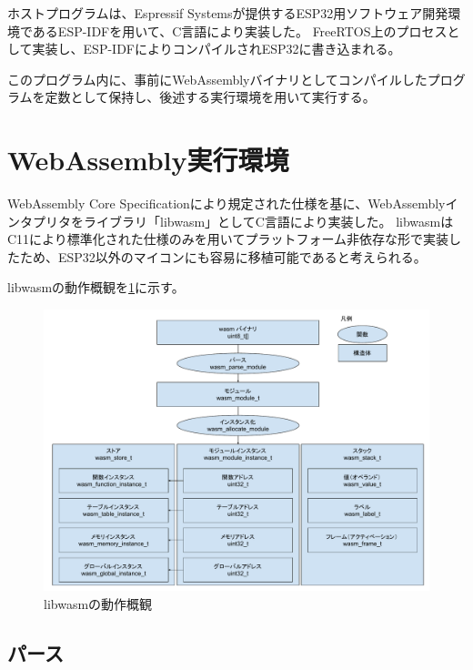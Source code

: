 ホストプログラムは、Espressif Systemsが提供するESP32用ソフトウェア開発環境であるESP-IDF\cite{esp_idf}を用いて、C言語により実装した。
FreeRTOS上のプロセスとして実装し、ESP-IDFによりコンパイルされESP32に書き込まれる。

このプログラム内に、事前にWebAssemblyバイナリとしてコンパイルしたプログラムを定数として保持し、後述する実行環境を用いて実行する。

\section{WebAssembly実行環境}

WebAssembly Core Specification\cite{wasm_spec}により規定された仕様を基に、WebAssemblyインタプリタをライブラリ「libwasm」としてC言語により実装した。
libwasmはC11により標準化された仕様のみを用いてプラットフォーム非依存な形で実装したため、ESP32以外のマイコンにも容易に移植可能であると考えられる。

libwasmの動作概観を\ref{fig:libwasm_arch}に示す。

\begin{figure}[htbp]
  \caption{libwasmの動作概観}
  \label{fig:libwasm_arch}
  \begin{center}
    \includegraphics[bb=0 0 915 667,width=15cm]{img/libwasm_arch.pdf}
  \end{center}
\end{figure}

\subsection{パース}


